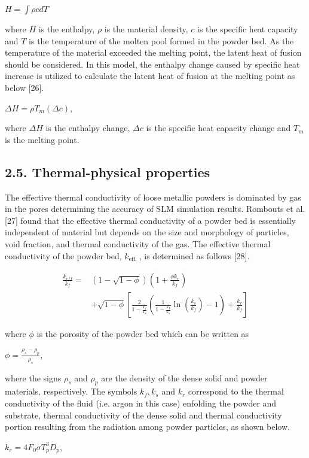\documentclass[10pt]{article}
\begin{document}
$H=\int \rho c d T$

where $H$ is the enthalpy, $\rho$ is the material density, $c$ is the specific heat capacity and $T$ is the temperature of the molten pool formed in the powder bed. As the temperature of the material exceeded the melting point, the latent heat of fusion should be considered. In this model, the enthalpy change caused by specific heat increase is utilized to calculate the latent heat of fusion at the melting point as below [26].

$\Delta H=\rho T_{m}(\Delta c)$,

where $\Delta H$ is the enthalpy change, $\Delta c$ is the specific heat capacity change and $T_{m}$ is the melting point.

\subsection*{2.5. Thermal-physical properties}
The effective thermal conductivity of loose metallic powders is dominated by gas in the pores determining the accuracy of SLM simulation results. Rombouts et al. [27] found that the effective thermal conductivity of a powder bed is essentially independent of material but depends on the size and morphology of particles, void fraction, and thermal conductivity of the gas. The effective thermal conductivity of the powder bed, $k_{\text {eff, }}$, is determined as follows [28].


\begin{align*}
\frac{k_{e f f}}{k_{f}}= & (1-\sqrt{1-\phi})\left(1+\frac{\phi k_{r}}{k_{f}}\right) \\
& +\sqrt{1-\phi}\left[\frac{2}{1-\frac{k_{f}}{k_{s}}}\left(\frac{1}{1-\frac{k_{f}}{k_{s}}} \ln \left(\frac{k_{s}}{k_{f}}\right)-1\right)+\frac{k_{r}}{k_{f}}\right] \tag{13}
\end{align*}


where $\phi$ is the porosity of the powder bed which can be written as

$\phi=\frac{\rho_{s}-\rho_{p}}{\rho_{s}}$,

where the signs $\rho_{s}$ and $\rho_{p}$ are the density of the dense solid and powder materials, respectively. The symbols $k_{f}, k_{s}$ and $k_{r}$ correspond to the thermal conductivity of the fluid (i.e. argon in this case) enfolding the powder and substrate, thermal conductivity of the dense solid and thermal conductivity portion resulting from the radiation among powder particles, as shown below.

$k_{r}=4 F_{0} \sigma T_{p}^{3} D_{p}$,
\end{document}
